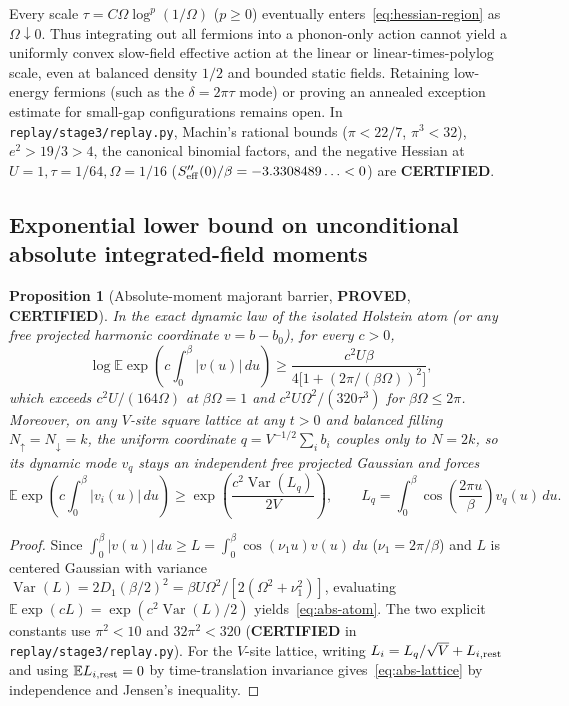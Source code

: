 \documentclass[11pt]{article}
\newtheorem{proposition}{Proposition}
\theoremstyle{remark}
\DeclareMathOperator{\Var}{Var}
\newcommand{\proved}{\textbf{PROVED}}
\newcommand{\certified}{\textbf{CERTIFIED}}
\begin{document}
Every scale $\tau=C\Omega\log^p(1/\Omega)$ ($p\ge 0$) eventually enters~\eqref{eq:hessian-region} as $\Omega\downarrow 0$. Thus integrating out all fermions into a phonon-only action cannot yield a uniformly convex slow-field effective action at the linear or linear-times-polylog scale, even at balanced density $1/2$ and bounded static fields. Retaining low-energy fermions (such as the $\delta=2\pi\tau$ mode) or proving an annealed exception estimate for small-gap configurations remains open. In \texttt{replay/stage3/replay.py}, Machin's rational bounds ($\pi<22/7$, $\pi^3<32$), $e^2>19/3>4$, the canonical binomial factors, and the negative Hessian at $U=1,\tau=1/64,\Omega=1/16$ ($S_{\rm eff}''(0)/\beta=-3.3308489\ldots<0$) are \certified{}.

\subsection{Exponential lower bound on unconditional absolute integrated-field moments}

\begin{proposition}[Absolute-moment majorant barrier, \proved, \certified]\label{prop:abs-moment}
In the exact dynamic law of the isolated Holstein atom (or any free projected harmonic coordinate $v=b-b_0$), for every $c>0$,
\begin{equation}\label{eq:abs-atom}
 \log\mathbb E\exp\!\left(c\int_0^\beta |v(u)|\,du\right)
 \ge \frac{c^2 U\beta}{4\bigl[1+(2\pi/(\beta\Omega))^2\bigr]},
\end{equation}
which exceeds $c^2 U/(164\Omega)$ at $\beta\Omega=1$ and $c^2 U\Omega^2/(320\tau^3)$ for $\beta\Omega\le 2\pi$. Moreover, on any $V$-site square lattice at any $t>0$ and balanced filling $N_\uparrow=N_\downarrow=k$, the uniform coordinate $q=V^{-1/2}\sum_i b_i$ couples only to $N=2k$, so its dynamic mode $v_q$ stays an independent free projected Gaussian and forces
\begin{equation}\label{eq:abs-lattice}
 \mathbb E\exp\!\left(c\int_0^\beta |v_i(u)|\,du\right)
 \ge \exp\!\left(\frac{c^2\Var(L_q)}{2V}\right),\qquad L_q=\int_0^\beta\cos\!\left(\frac{2\pi u}{\beta}\right)v_q(u)\,du.
\end{equation}
\end{proposition}

\begin{proof}
Since $\int_0^\beta |v(u)|\,du \ge L=\int_0^\beta\cos(\nu_1 u)v(u)\,du$ ($\nu_1=2\pi/\beta$) and $L$ is centered Gaussian with variance $\Var(L)=2D_1(\beta/2)^2=\beta U\Omega^2/[2(\Omega^2+\nu_1^2)]$, evaluating $\mathbb E\exp(cL)=\exp(c^2\Var(L)/2)$ yields~\eqref{eq:abs-atom}. The two explicit constants use $\pi^2<10$ and $32\pi^2<320$ (\certified{} in \nolinkurl{replay/stage3/replay.py}). For the $V$-site lattice, writing $L_i=L_q/\sqrt{V}+L_{i,\rm rest}$ and using $\mathbb E L_{i,\rm rest}=0$ by time-translation invariance gives~\eqref{eq:abs-lattice} by independence and Jensen's inequality.
\end{proof}
\end{document}
